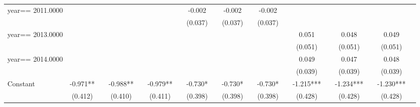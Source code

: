 \begin{table}[htbp]
\begin{tabular}{l*{18}{c}}
year==  2011.0000   &               &               &               &               &               &               &      -0.002   &               &      -0.002   &               &      -0.002   &               &               &               &               &               &               &               \\
                    &               &               &               &               &               &               &     (0.037)   &               &     (0.037)   &               &     (0.037)   &               &               &               &               &               &               &               \\
year==  2013.0000   &               &               &               &               &               &               &               &               &               &               &               &               &       0.051   &               &       0.048   &               &       0.049   &               \\
                    &               &               &               &               &               &               &               &               &               &               &               &               &     (0.051)   &               &     (0.051)   &               &     (0.051)   &               \\
year==  2014.0000   &               &               &               &               &               &               &               &               &               &               &               &               &       0.049   &               &       0.047   &               &       0.048   &               \\
                    &               &               &               &               &               &               &               &               &               &               &               &               &     (0.039)   &               &     (0.039)   &               &     (0.039)   &               \\
Constant            &      -0.971** &               &      -0.988** &               &      -0.979** &               &      -0.730*  &               &      -0.730*  &               &      -0.730*  &               &      -1.215***&               &      -1.234***&               &      -1.230***&               \\
                    &     (0.412)   &               &     (0.410)   &               &     (0.411)   &               &     (0.398)   &               &     (0.398)   &               &     (0.398)   &               &     (0.428)   &               &     (0.428)   &               &     (0.428)   &               \\

\end{tabular}
\end{table}
